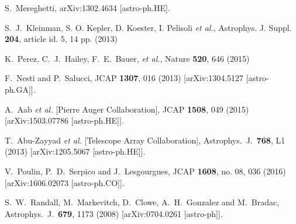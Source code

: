 \documentclass[twocolumn,preprintnumbers,amsmath,amssymb,prl, superscriptaddress]{revtex4}
\begin{document}
\begin{thebibliography}{99}
  S.~Mereghetti,
  arXiv:1302.4634 [astro-ph.HE].


S.~J.~Kleinman, S. O. Kepler, D. Koester, I. Pelisoli  {\it et al.}, Astrophys. J. Suppl. {\bf 204}, article
id. 5, 14 pp. (2013)

K.~Perez, C.~J.~Hailey, F.~E.~Bauer, {\it et al.}, Nature {\bf 520}, 646 (2015)

  F.~Nesti and P.~Salucci,
  JCAP {\bf 1307}, 016 (2013)
  [arXiv:1304.5127 [astro-ph.GA]].


  A.~Aab {\it et al.} [Pierre Auger Collaboration],
  JCAP {\bf 1508}, 049 (2015)
  [arXiv:1503.07786 [astro-ph.HE]].


  T.~Abu-Zayyad {\it et al.} [Telescope Array Collaboration],
  Astrophys.\ J.\  {\bf 768}, L1 (2013)
  [arXiv:1205.5067 [astro-ph.HE]].


  V.~Poulin, P.~D.~Serpico and J.~Lesgourgues,
  JCAP {\bf 1608}, no. 08, 036 (2016)
  [arXiv:1606.02073 [astro-ph.CO]].


  S.~W.~Randall, M.~Markevitch, D.~Clowe, A.~H.~Gonzalez and M.~Bradac,
  Astrophys.\ J.\  {\bf 679}, 1173 (2008)
  [arXiv:0704.0261 [astro-ph]].



\end{thebibliography}
\end{document}
